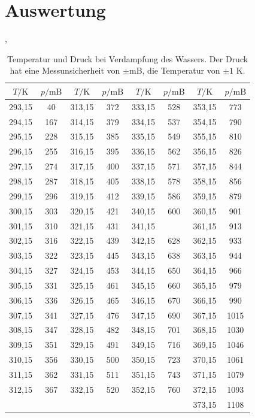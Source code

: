 \newpage
\section{Auswertung}
\label{sec:Auswertung}

\begin{table}
  \centering
  \caption{Temperatur und Druck bei Verdampfung des Wassers. Der Druck hat eine Messunsicherheit von
  $\pm$mB, die Temperatur von $\pm 1$ K.},
  \label{tab:Messreihe_1}
\begin{tabular}{
  c c||c c||c c||c c
}
\toprule 
$T/ \unit{\kelvin}$ & $p / \text{mB}$ & $T/ \unit{\kelvin}$ & $p / \text{mB}$&
$T/ \unit{\kelvin}$ & $p / \text{mB}$ & $T/ \unit{\kelvin}$ & $p / \text{mB}$ \\
\midrule
293,15  & 40   & 313,15  & 372  & 333,15  & 528  & 353,15  & 773 \\
294,15  & 167  & 314,15  & 379  & 334,15  & 537  & 354,15  & 790 \\
295,15  & 228  & 315,15  & 385  & 335,15  & 549  & 355,15  & 810 \\
296,15  & 255  & 316,15  & 395  & 336,15  & 562  & 356,15  & 826 \\
297,15  & 274  & 317,15  & 400  & 337,15  & 571  & 357,15  & 844 \\
298,15  & 287  & 318,15  & 405  & 338,15  & 578  & 358,15  & 856 \\
299,15  & 296  & 319,15  & 412  & 339,15  & 586  & 359,15  & 879 \\
300,15  & 303  & 320,15  & 421  & 340,15  & 600  & 360,15  & 901 \\
301,15  & 310  & 321,15  & 431  & 341,15  & \text{--}  & 361,15  & 913 \\
302,15  & 316  & 322,15  & 439  & 342,15  & 628  & 362,15  & 933 \\
303,15  & 322  & 323,15  & 445  & 343,15  & 638  & 363,15  & 944 \\
304,15  & 327  & 324,15  & 453  & 344,15  & 650  & 364,15  & 966 \\
305,15  & 331  & 325,15  & 461  & 345,15  & 660  & 365,15  & 979 \\
306,15  & 336  & 326,15  & 465  & 346,15  & 670  & 366,15  & 990 \\
307,15  & 341  & 327,15  & 476  & 347,15  & 690  & 367,15  & 1015\\
308,15  & 347  & 328,15  & 482  & 348,15  & 701  & 368,15  & 1030\\
309,15  & 351  & 329,15  & 491  & 349,15  & 716  & 369,15  & 1046\\
310,15  & 356  & 330,15  & 500  & 350,15  & 723  & 370,15  & 1061\\
311,15  & 362  & 331,15  & 511  & 351,15  & 743  & 371,15  & 1079\\
312,15  & 367  & 332,15  & 520  & 352,15  & 760  & 372,15  & 1093\\
      &   &       &       &       &      & 373,15  & 1108 \\
\bottomrule
\end{tabular}
\end{table}
